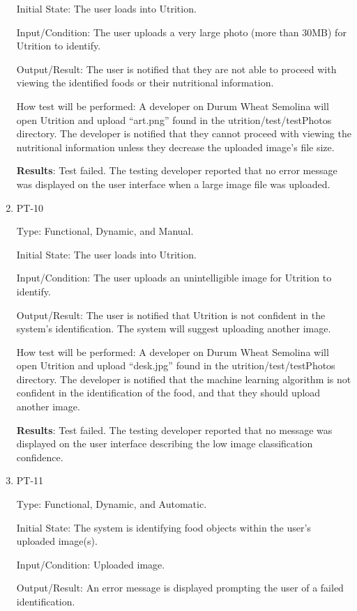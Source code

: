 \documentclass[12pt, titlepage]{article}
\begin{document}
\begin{enumerate}
		Initial State: The user loads into Utrition.
		
		Input/Condition: The user uploads a very large photo (more than 30MB) for Utrition to identify.
		
		Output/Result: The user is notified that they are not able to proceed with viewing the identified foods or their nutritional information.
		
		How test will be performed: A developer on Durum Wheat Semolina will open Utrition and upload “art.png” found in the utrition/test/testPhotos directory. The developer is notified that they cannot proceed with viewing the nutritional information unless they decrease the uploaded image’s file size.
		
		\textbf{Results}: Test failed. The testing developer reported that no error message was displayed on the user interface when a large image file was uploaded.
		
		\item{PT-10} 
		
		Type: Functional, Dynamic, and Manual.
		
		Initial State: The user loads into Utrition.
		
		Input/Condition: The user uploads an unintelligible image for Utrition to identify.
		
		Output/Result: The user is notified that Utrition is not confident in the system’s identification. The system will suggest uploading another image.
		
		How test will be performed: A developer on Durum Wheat Semolina will 
		open Utrition and upload “desk.jpg” found in the utrition/test/testPhotos directory. The developer 
		is notified that the machine learning algorithm is not confident in the 
		identification of the food, and that they should upload another image.
		
		\textbf{Results}: Test failed. The testing developer reported that no message was displayed on the user interface describing the low image classification confidence.
		
		\item{PT-11}
		
		Type: Functional, Dynamic, and Automatic.
		
		Initial State: The system is identifying food objects within the user's 
		uploaded image(s).
		
		Input/Condition: Uploaded image.
		
		Output/Result: An error message is displayed prompting the user of a failed 
		identification.
		

\end{enumerate}
\end{document}
